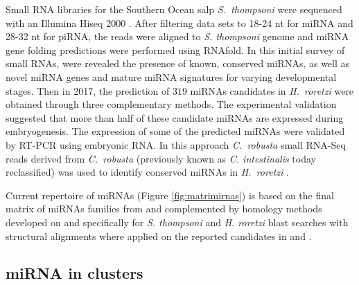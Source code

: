 \documentclass[graybox]{svmult}
\newcommand{\TODO}[1]{\begingroup\color{red}#1\endgroup}
\begin{document}
Small RNA libraries for the Southern Ocean salp \textit{S.\ thompsoni} 
were sequenced with an Illumina Hiseq 2000 \citep{Jue2016}. After filtering data
sets to 18-24 nt for miRNA and 28-32 nt for piRNA, the reads were aligned
to \textit{S. thompsoni} genome and miRNA gene folding predictions were
performed using RNAfold. In this initial survey of small RNAs, were
revealed the presence of known, conserved miRNAs, as well as novel miRNA
genes and mature miRNA signatures for varying developmental stages. Then in
2017, the prediction of $319$ miRNAs candidates in \textit{H.\ roretzi}
were obtained through three complementary methods. The experimental
validation suggested that more than half of these candidate miRNAs are
expressed during embryogenesis. The expression of some of the predicted
miRNAs were validated by RT-PCR using embryonic RNA. In this approach
\textit{C.\ robusta} small RNA-Seq reads derived from \textit{C.\ robusta}
\citep{Shi2009} (previously known as \textit{C. intestinalis} today
reclassified) was used to identify conserved miRNAs in \textit{H.\ roretzi}
\citep{Wang2017}.

Current repertoire of miRNAs (Figure \ref{fig:matrimirnas}) is based on the
final matrix of miRNAs families from \citet{Hertel:15a} and complemented by
homology methods developed on \citet{Velandia-Huerto2016} and specifically for
\textit{S. thompsoni} and \textit{H. roretzi} blast searches with
structural alignments where applied on the reported candidates in
\citet{Jue2016} and \citet{Wang2017}.


\subsection{miRNA in clusters}
\end{document}
